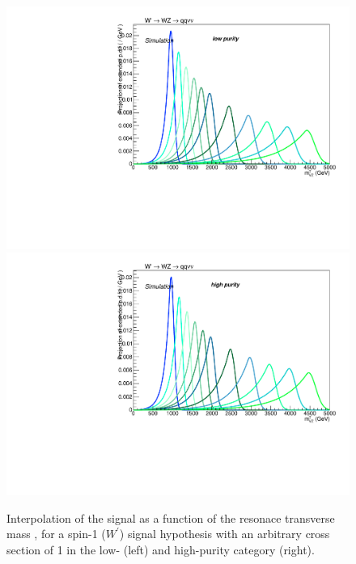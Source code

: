 \begin{figure}[!htb]
  \centering
    \includegraphics[width=.495\textwidth]{plotsAlpha_tesi/XVZnnlp/XWZInv_Signal.pdf}
    \includegraphics[width=.495\textwidth]{plotsAlpha_tesi/XVZnnhp/XWZInv_Signal.pdf}
  \caption{Interpolation of the signal as a function of the resonace transverse mass \mtVZ, for a spin-1 ($W^{'}$) signal hypothesis with an arbitrary cross section of 1 \pb in the low- (left) and high-purity category (right).}
  \label{fig:XWZInv_Signal}
\end{figure}



